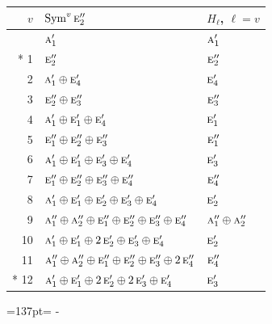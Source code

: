 \documentclass[10pt,a4paper]{article}
\newcommand{\needspace}[1]{\par\penalty-100\begingroup\dimen0=#1\relax\dimen2=\pagegoal
  \advance\dimen2-\pagetotal\ifdim\dimen0>\dimen2\relax\ifdim\dimen2>0pt\vfil\break\fi\fi
  \endgroup}
\numberwithin{equation}{section}
\newcommand{\irr}[1]{\text{\normalfont\scshape #1}}
\begin{document}
{\small\begin{longtable}{@{}rll@{}}\toprule
$v$ & $\operatorname{Sym}^{v}\irr{e}_{2}''$ & $H_\ell$, $\ell = v$\\\midrule\endhead
\bottomrule\endfoot\endlastfoot
0 & $\irr{a}_{1}'$ & $\irr{a}_{1}'$\\*
1 & $\irr{e}_{2}''$ & $\irr{e}_{2}''$\\
2 & $\irr{a}_{1}' \oplus \irr{e}_{4}'$ & $\irr{e}_{4}'$\\
3 & $\irr{e}_{2}'' \oplus \irr{e}_{3}''$ & $\irr{e}_{3}''$\\
4 & $\irr{a}_{1}' \oplus \irr{e}_{1}' \oplus \irr{e}_{4}'$ & $\irr{e}_{1}'$\\
5 & $\irr{e}_{1}'' \oplus \irr{e}_{2}'' \oplus \irr{e}_{3}''$ & $\irr{e}_{1}''$\\
6 & $\irr{a}_{1}' \oplus \irr{e}_{1}' \oplus \irr{e}_{3}' \oplus \irr{e}_{4}'$ & $\irr{e}_{3}'$\\
7 & $\irr{e}_{1}'' \oplus \irr{e}_{2}'' \oplus \irr{e}_{3}'' \oplus \irr{e}_{4}''$ & $\irr{e}_{4}''$\\
8 & $\irr{a}_{1}' \oplus \irr{e}_{1}' \oplus \irr{e}_{2}' \oplus \irr{e}_{3}' \oplus \irr{e}_{4}'$ & $\irr{e}_{2}'$\\
9 & $\irr{a}_{1}'' \oplus \irr{a}_{2}'' \oplus \irr{e}_{1}'' \oplus \irr{e}_{2}'' \oplus \irr{e}_{3}'' \oplus \irr{e}_{4}''$ & $\irr{a}_{1}'' \oplus \irr{a}_{2}''$\\
10 & $\irr{a}_{1}' \oplus \irr{e}_{1}' \oplus 2\,\irr{e}_{2}' \oplus \irr{e}_{3}' \oplus \irr{e}_{4}'$ & $\irr{e}_{2}'$\\
11 & $\irr{a}_{1}'' \oplus \irr{a}_{2}'' \oplus \irr{e}_{1}'' \oplus \irr{e}_{2}'' \oplus \irr{e}_{3}'' \oplus 2\,\irr{e}_{4}''$ & $\irr{e}_{4}''$\\*
12 & $\irr{a}_{1}' \oplus \irr{e}_{1}' \oplus 2\,\irr{e}_{2}' \oplus 2\,\irr{e}_{3}' \oplus \irr{e}_{4}'$ & $\irr{e}_{3}'$\\
\bottomrule\end{longtable}}
\needspace{137pt}
\end{document}

